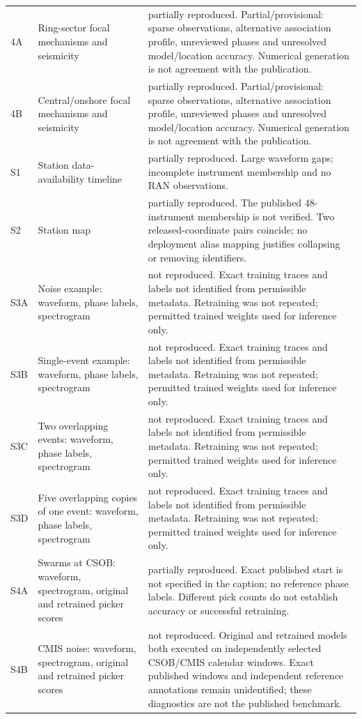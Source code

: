 \begin{longtable}{>{\raggedright\arraybackslash}p{.13\linewidth}>{\raggedright\arraybackslash}p{.28\linewidth}>{\raggedright\arraybackslash}p{.49\linewidth}}
4A & Ring-sector focal mechanisms and seismicity & partially reproduced. Partial/provisional: sparse observations, alternative association profile, unreviewed phases and unresolved model/location accuracy. Numerical generation is not agreement with the publication.\\[3pt]
4B & Central/\allowbreak{}onshore focal mechanisms and seismicity & partially reproduced. Partial/provisional: sparse observations, alternative association profile, unreviewed phases and unresolved model/location accuracy. Numerical generation is not agreement with the publication.\\[3pt]
S1 & Station data-availability timeline & partially reproduced. Large waveform gaps; incomplete instrument membership and no RAN observations.\\[3pt]
S2 & Station map & partially reproduced. The published 48-instrument membership is not verified. Two released-coordinate pairs coincide; no deployment alias mapping justifies collapsing or removing identifiers.\\[3pt]
S3A & Noise example: waveform, phase labels, spectrogram & not reproduced. Exact training traces and labels not identified from permissible metadata. Retraining was not repeated; permitted trained weights used for inference only.\\[3pt]
S3B & Single-event example: waveform, phase labels, spectrogram & not reproduced. Exact training traces and labels not identified from permissible metadata. Retraining was not repeated; permitted trained weights used for inference only.\\[3pt]
S3C & Two overlapping events: waveform, phase labels, spectrogram & not reproduced. Exact training traces and labels not identified from permissible metadata. Retraining was not repeated; permitted trained weights used for inference only.\\[3pt]
S3D & Five overlapping copies of one event: waveform, phase labels, spectrogram & not reproduced. Exact training traces and labels not identified from permissible metadata. Retraining was not repeated; permitted trained weights used for inference only.\\[3pt]
S4A & Swarms at CSOB: waveform, spectrogram, original and retrained picker scores & partially reproduced. Exact published start is not specified in the caption; no reference phase labels. Different pick counts do not establish accuracy or successful retraining.\\[3pt]
S4B & CMIS noise: waveform, spectrogram, original and retrained picker scores & not reproduced. Original and retrained models both executed on independently selected CSOB/CMIS calendar windows. Exact published windows and independent reference annotations remain unidentified; these diagnostics are not the published benchmark.\\[3pt]

\end{longtable}
